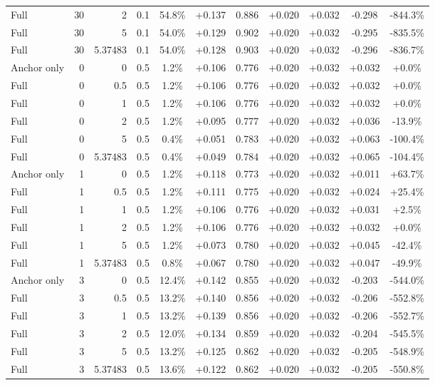 \begin{table}[htbp]
\begin{tabular}{lrrrccccccc}
Full & 30 & 2 & 0.1 & 54.8\% & +0.137 & 0.886 & +0.020 & +0.032 & -0.298 & -844.3\% \\
Full & 30 & 5 & 0.1 & 54.0\% & +0.129 & 0.902 & +0.020 & +0.032 & -0.295 & -835.5\% \\
Full & 30 & 5.37483 & 0.1 & 54.0\% & +0.128 & 0.903 & +0.020 & +0.032 & -0.296 & -836.7\% \\
Anchor only & 0 & 0 & 0.5 & 1.2\% & +0.106 & 0.776 & +0.020 & +0.032 & +0.032 & +0.0\% \\
Full & 0 & 0.5 & 0.5 & 1.2\% & +0.106 & 0.776 & +0.020 & +0.032 & +0.032 & +0.0\% \\
Full & 0 & 1 & 0.5 & 1.2\% & +0.106 & 0.776 & +0.020 & +0.032 & +0.032 & +0.0\% \\
Full & 0 & 2 & 0.5 & 1.2\% & +0.095 & 0.777 & +0.020 & +0.032 & +0.036 & -13.9\% \\
Full & 0 & 5 & 0.5 & 0.4\% & +0.051 & 0.783 & +0.020 & +0.032 & +0.063 & -100.4\% \\
Full & 0 & 5.37483 & 0.5 & 0.4\% & +0.049 & 0.784 & +0.020 & +0.032 & +0.065 & -104.4\% \\
Anchor only & 1 & 0 & 0.5 & 1.2\% & +0.118 & 0.773 & +0.020 & +0.032 & +0.011 & +63.7\% \\
Full & 1 & 0.5 & 0.5 & 1.2\% & +0.111 & 0.775 & +0.020 & +0.032 & +0.024 & +25.4\% \\
Full & 1 & 1 & 0.5 & 1.2\% & +0.106 & 0.776 & +0.020 & +0.032 & +0.031 & +2.5\% \\
Full & 1 & 2 & 0.5 & 1.2\% & +0.106 & 0.776 & +0.020 & +0.032 & +0.032 & +0.0\% \\
Full & 1 & 5 & 0.5 & 1.2\% & +0.073 & 0.780 & +0.020 & +0.032 & +0.045 & -42.4\% \\
Full & 1 & 5.37483 & 0.5 & 0.8\% & +0.067 & 0.780 & +0.020 & +0.032 & +0.047 & -49.9\% \\
Anchor only & 3 & 0 & 0.5 & 12.4\% & +0.142 & 0.855 & +0.020 & +0.032 & -0.203 & -544.0\% \\
Full & 3 & 0.5 & 0.5 & 13.2\% & +0.140 & 0.856 & +0.020 & +0.032 & -0.206 & -552.8\% \\
Full & 3 & 1 & 0.5 & 13.2\% & +0.139 & 0.856 & +0.020 & +0.032 & -0.206 & -552.7\% \\
Full & 3 & 2 & 0.5 & 12.0\% & +0.134 & 0.859 & +0.020 & +0.032 & -0.204 & -545.5\% \\
Full & 3 & 5 & 0.5 & 13.2\% & +0.125 & 0.862 & +0.020 & +0.032 & -0.205 & -548.9\% \\
Full & 3 & 5.37483 & 0.5 & 13.6\% & +0.122 & 0.862 & +0.020 & +0.032 & -0.205 & -550.8\% \\

\end{tabular}
\end{table}
